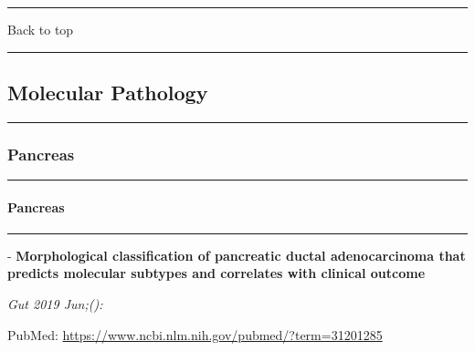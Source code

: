 \documentclass[]{article}
\let\oldparagraph\paragraph
\renewcommand{\paragraph}[1]{\oldparagraph{#1}\mbox{}}
\begin{document}
{}

{}

\begin{center}\rule{0.5\linewidth}{\linethickness}\end{center}

Back to top

\begin{center}\rule{0.5\linewidth}{\linethickness}\end{center}

\pagebreak

\hypertarget{molecular-pathology}{%
\subsection{Molecular Pathology}\label{molecular-pathology}}

\begin{center}\rule{0.5\linewidth}{\linethickness}\end{center}

\hypertarget{pancreas-2}{%
\subsubsection{Pancreas}\label{pancreas-2}}

\begin{center}\rule{0.5\linewidth}{\linethickness}\end{center}

\hypertarget{pancreas-3}{%
\paragraph{Pancreas}\label{pancreas-3}}

\begin{center}\rule{0.5\linewidth}{\linethickness}\end{center}

 - \textbf{Morphological classification of pancreatic ductal
adenocarcinoma that predicts molecular subtypes and correlates with
clinical outcome}

\emph{Gut 2019 Jun;():}

PubMed: \url{https://www.ncbi.nlm.nih.gov/pubmed/?term=31201285}
\end{document}
